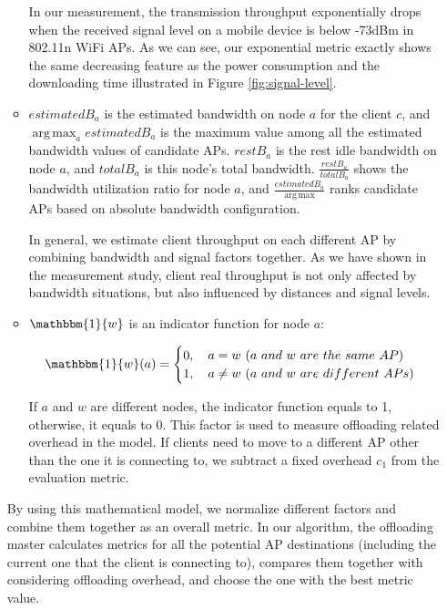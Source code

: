 \documentclass[english]{tktltiki}
\begin{document}
\begin{enumerate}
\begin{itemize}
In our measurement, the transmission throughput exponentially drops when the received signal level on a mobile device is below -73dBm in 802.11n WiFi APs. As we can see, our exponential metric exactly shows the same decreasing feature as the power consumption and the downloading time illustrated in Figure \ref{fig:signal-level}.
  
  \item $estimatedB_a$ is the estimated bandwidth on node $a$ for the client $c$, and $\operatorname*{arg\,max}_a estimatedB_a$ is the maximum value among all the estimated bandwidth values of candidate APs. $restB_a$ is the rest idle bandwidth on node $a$, and $totalB_a$ is this node's total bandwidth. $\frac{restB_a}{totalB_a}$ shows the bandwidth utilization ratio for node $a$, and $\frac{estimatedB_a}{\operatorname*{arg\,max}}$ ranks candidate APs based on absolute bandwidth configuration.
  
  \vspace{5mm}
  
  In general, we estimate client throughput on each different AP by combining bandwidth and signal factors together. As we have shown in the measurement study, client real throughput is not only affected by bandwidth situations, but also influenced by distances and signal levels.
  
  \item $\mathbbm{1}{w}$ is an indicator function for node $a$:

$$ \mathbbm{1}{w}(a)=\begin{cases}
0,\quad a = w \ (a \ and \ w \ are \ the \ same \ AP) \\
1,\quad a \neq w \ (a \ and \ w \ are \ different \ APs)
\end{cases} $$
  
If $a$ and $w$ are different nodes, the indicator function equals to 1, otherwise, it equals to 0. This factor is used to measure offloading related overhead in the model. If clients need to move to a different AP other than the one it is connecting to, we subtract a fixed overhead $c_1$ from the evaluation metric.

\end{itemize}

By using this mathematical model, we normalize different factors and combine them together as an overall metric. In our algorithm, the offloading master calculates metrics for all the potential AP destinations (including the current one that the client is connecting to), compares them together with considering offloading overhead, and choose the one with the best metric value.

\end{enumerate}
\end{document}
